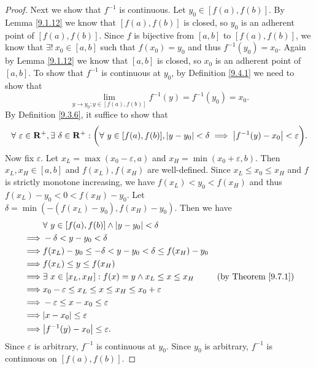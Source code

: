 \begin{proof}
    Next we show that \(f^{-1}\) is continuous.
    Let \(y_0 \in [f(a), f(b)]\).
    By Lemma \ref{9.1.12} we know that \([f(a), f(b)]\) is closed, so \(y_0\) is an adherent point of \([f(a), f(b)]\).
    Since \(f\) is bijective from \([a, b]\) to \([f(a), f(b)]\), we know that \(\exists!\ x_0 \in [a, b]\) such that \(f(x_0) = y_0\) and thus \(f^{-1}(y_0) = x_0\).
    Again by Lemma \ref{9.1.12} we know that \([a, b]\) is closed, so \(x_0\) is an adherent point of \([a, b]\).
    To show that \(f^{-1}\) is continuous at \(y_0\), by Definition \ref{9.4.1} we need to show that
    \[
        \lim_{y \to y_0 ; y \in [f(a), f(b)]} f^{-1}(y) = f^{-1}(y_0) = x_0.
    \]
    By Definition \ref{9.3.6}, it suffice to show that
    \[
        \forall\ \varepsilon \in \mathbf{R}^+, \exists\ \delta \in \mathbf{R}^+ : \bigg(\forall\ y \in [f(a), f(b)], \abs*{y - y_0} < \delta \implies \abs*{f^{-1}(y) - x_0} < \varepsilon\bigg).
    \]
    Now fix \(\varepsilon\).
    Let \(x_L = \max(x_0 - \varepsilon, a)\) and \(x_H = \min(x_0 + \varepsilon, b)\).
    Then \(x_L, x_H \in [a, b]\) and \(f(x_L), f(x_H)\) are well-defined.
    Since \(x_L \leq x_0 \leq x_H\) and \(f\) is strictly monotone increasing, we have \(f(x_L) < y_0 < f(x_H)\) and thus \(f(x_L) - y_0 < 0 < f(x_H) - y_0\).
    Let \(\delta = \min(-(f(x_L) - y_0), f(x_H) - y_0)\).
    Then we have
    \begin{align*}
                 & \forall\ y \in [f(a), f(b)] \land \abs*{y - y_0} < \delta                                           \\
        \implies & -\delta < y - y_0 < \delta                                                                          \\
        \implies & f(x_L) - y_0 \leq -\delta < y - y_0 < \delta \leq f(x_H) - y_0                                      \\
        \implies & f(x_L) \leq y \leq f(x_H)                                                                           \\
        \implies & \exists\ x \in [x_L, x_H] : f(x) = y \land x_L \leq x \leq x_H    & \text{(by Theorem \ref{9.7.1})} \\
        \implies & x_0 - \varepsilon \leq x_L \leq x \leq x_H \leq x_0 + \varepsilon                                   \\
        \implies & -\varepsilon \leq x - x_0 \leq \varepsilon                                                          \\
        \implies & \abs*{x - x_0} \leq \varepsilon                                                                     \\
        \implies & \abs*{f^{-1}(y) - x_0} \leq \varepsilon.
    \end{align*}
    Since \(\varepsilon\) is arbitrary, \(f^{-1}\) is continuous at \(y_0\).
    Since \(y_0\) is arbitrary, \(f^{-1}\) is continuous on \([f(a), f(b)]\).


\end{proof}
